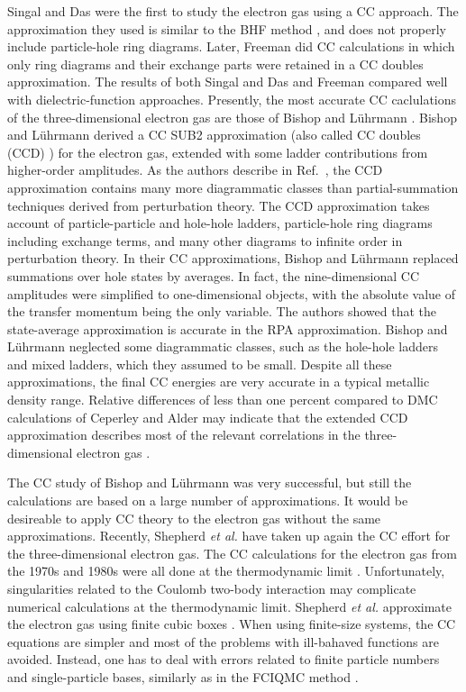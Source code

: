 \documentclass[aps,twocolumn,showpacs,floatfix,nofootinbib,preprintnumbers,superscriptaddress,amsmath,amssymb]{revtex4-1}
\begin{document}
Singal and Das \cite{singal1973} were the first to study 
the electron gas using a CC approach. The approximation
they used is similar to the BHF method \cite{haftel1970}, 
and does not properly include particle-hole ring diagrams.
Later, Freeman did CC calculations \cite{freeman1977} in 
which only ring diagrams and their exchange parts were 
retained in a CC doubles approximation. The results of both
Singal and Das \cite{singal1973} and Freeman 
\cite{freeman1977} compared well with dielectric-function
approaches. Presently, the most accurate CC caclulations of 
the three-dimensional electron gas are those of Bishop and
L{\"u}hrmann \cite{bishop1978,bishop1982}. Bishop and
L{\"u}hrmann derived a CC SUB2 approximation (also called
CC doubles (CCD) \cite{shavittbartlett2009}) for the electron gas, 
extended with some ladder contributions from higher-order
amplitudes. As the authors describe in 
Ref.~\cite{bishop1978}, the CCD approximation 
contains many more diagrammatic classes than
partial-summation techniques derived from perturbation 
theory. The CCD approximation takes account of 
particle-particle and hole-hole ladders, particle-hole
ring diagrams including exchange terms, and many other
diagrams to infinite order in perturbation theory. 
In their CC approximations, Bishop and L{\"u}hrmann 
replaced summations over hole states by averages. In
fact, the nine-dimensional CC amplitudes were simplified
to one-dimensional objects, with the absolute value
of the transfer momentum being the only variable. 
The authors showed that the state-average approximation
is accurate in the RPA approximation.
Bishop and L{\"u}hrmann neglected some diagrammatic 
classes, such as the hole-hole ladders and mixed ladders, 
which they assumed to be small. Despite all these 
approximations, the final CC energies are very accurate 
in a typical metallic density range. Relative 
differences of less than one percent
compared to DMC calculations of Ceperley and Alder
may indicate that the extended CCD approximation describes
most of the relevant correlations in the three-dimensional
electron gas \cite{bishop1982}. 

The CC study of Bishop and L{\"u}hrmann was very successful, but still
the calculations are based on a large number of approximations. It
would be desireable to apply CC theory to the electron gas without the
same approximations.  Recently, Shepherd \emph{et al.}
\cite{shepherd2012b,shepherd2013a,shepherd2013b,shepherd2013c} have
taken up again the CC effort for the three-dimensional electron
gas. The CC calculations for the electron gas from the 1970s and 1980s
were all done at the thermodynamic limit
\cite{singal1973,freeman1977,bishop1978,bishop1982}. Unfortunately,
singularities related to the Coulomb two-body interaction may
complicate numerical calculations at the thermodynamic limit.
Shepherd \emph{et al.} approximate the electron gas using finite cubic
boxes
\cite{shepherd2012b,shepherd2013a,shepherd2013b,shepherd2013c}. When
using finite-size systems, the CC equations are simpler and most of
the problems with ill-bahaved functions are avoided.  Instead, one has
to deal with errors related to finite particle numbers and
single-particle bases, similarly as in the FCIQMC method
\cite{shepherd2012a,shepherd2012b,shepherd2012c}.
\end{document}

